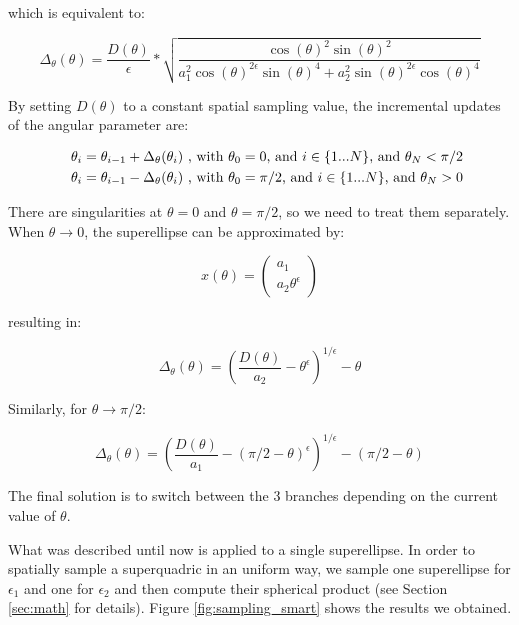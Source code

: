 \documentclass{article}
\begin{document}
which is equivalent to:

\begin{equation}
\Delta_\theta (\theta) = \frac{D(\theta)}{\epsilon} * \sqrt {\frac{ \cos (\theta) ^2 \sin (\theta) ^2} {a_1^2 \cos (\theta)^{2\epsilon} \sin(\theta)^4 + a_2^2 \sin (\theta)^{2\epsilon} \cos(\theta)^4}}
\end{equation}

By setting $D(\theta)$ to a constant spatial sampling value, the incremental updates of the angular parameter are:

\begin{eqnarray}
&& \theta_i = \theta_{i-1} + \Delta_\theta (\theta_i) \textnormal{ , with } \theta_0 = 0 \textnormal{, and } i \in \{ 1 ... N \} \textnormal {, and } \theta_N < \pi / 2 \\
&& \theta_i = \theta_{i-1} - \Delta_\theta (\theta_i) \textnormal{ , with } \theta_0 = \pi/2 \textnormal{, and } i \in \{ 1 ... N \} \textnormal {, and } \theta_N > 0
\end{eqnarray}

There are singularities at $\theta = 0$ and $\theta = \pi/2$, so we need to treat them separately. When $\theta \rightarrow 0$, the superellipse can be approximated by:

\begin{equation}
x (\theta) = \begin{pmatrix} a_1 \\ a_2 \theta ^\epsilon \end{pmatrix}
\end{equation}

resulting in:

\begin{equation}
\Delta_\theta (\theta) = \left(\frac{D (\theta)}{a_2} - \theta^\epsilon \right)^{1/\epsilon} - \theta
\end{equation}

Similarly, for $\theta \rightarrow \pi/2$:

\begin{equation}
\Delta_\theta (\theta) = \left( \frac{D(\theta)}{a_1} - (\pi/2 - \theta)^\epsilon \right)^{1/\epsilon} - (\pi/2 - \theta)
\end{equation}

The final solution is to switch between the 3 branches depending on the current value of $\theta$.

What was described until now is applied to a single superellipse. In order to spatially sample a superquadric in an uniform way, we sample one superellipse for $\epsilon_1$ and one for $\epsilon_2$ and then compute their spherical product (see Section \ref{sec:math} for details). Figure \ref{fig:sampling_smart} shows the results we obtained.
\end{document}
